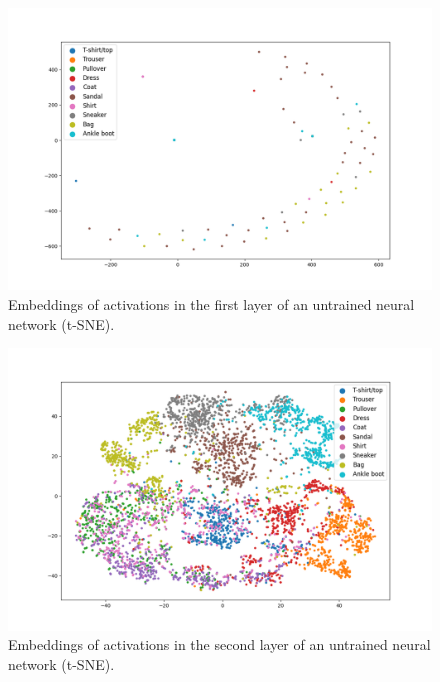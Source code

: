 \documentclass{article}
\begin{document}
\begin{figure}
  \centering
    \includegraphics[width=1.0\textwidth]{../../out/activations_cnn/fmnist/t-sne/untrained/plot_l1_f0.png}
    \caption{Embeddings of activations in the first layer of an untrained neural network (t-SNE).}
\end{figure}

\begin{figure}
  \centering
    \includegraphics[width=1.0\textwidth]{../../out/activations_cnn/fmnist/t-sne/untrained/plot_l2_f0.png}
    \caption{Embeddings of activations in the second layer of an untrained neural network (t-SNE).}
\end{figure}
\end{document}
